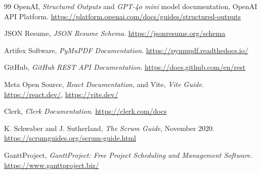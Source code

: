 \documentclass[12pt,a4paper,oneside]{book}
\begin{document}
\begin{thebibliography}{99}
OpenAI, \emph{Structured Outputs} and \emph{GPT-4o mini} model documentation, OpenAI API Platform.
\url{https://platform.openai.com/docs/guides/structured-outputs}

JSON Resume, \emph{JSON Resume Schema}.
\url{https://jsonresume.org/schema}

Artifex Software, \emph{PyMuPDF Documentation}.
\url{https://pymupdf.readthedocs.io/}

GitHub, \emph{GitHub REST API Documentation}.
\url{https://docs.github.com/en/rest}

Meta Open Source, \emph{React Documentation}, and Vite, \emph{Vite Guide}.
\url{https://react.dev/}, \url{https://vite.dev/}

Clerk, \emph{Clerk Documentation}.
\url{https://clerk.com/docs}

K. Schwaber and J. Sutherland, \emph{The Scrum Guide}, November 2020.
\url{https://scrumguides.org/scrum-guide.html}

GanttProject, \emph{GanttProject: Free Project Scheduling and Management Software}.
\url{https://www.ganttproject.biz/}



\end{thebibliography}
\end{document}
